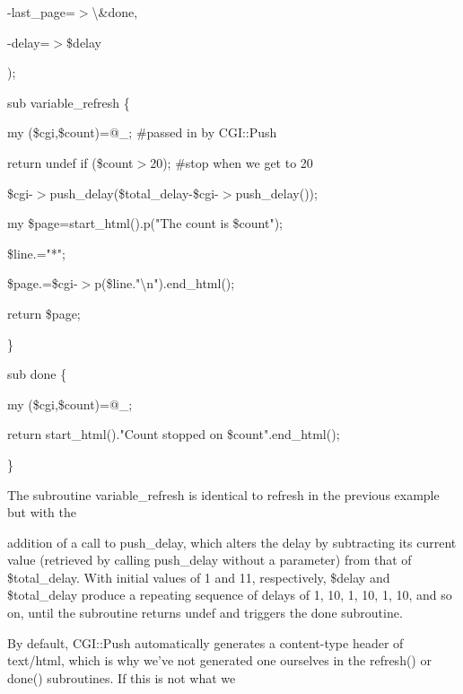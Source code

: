 \documentclass[a4paper,11pt]{book}
\begin{document}
\noindent -last\_page=$>$\textbackslash \&done,

\noindent -delay=$>$\$delay

\noindent );

\noindent 

\noindent 

\noindent sub variable\_refresh \{

\noindent my (\$cgi,\$count)=@\_; \#passed in by CGI::Push

\noindent 

\noindent return undef if (\$count$>$20); \#stop when we get to 20

\noindent 

\noindent \$cgi-$>$push\_delay(\$total\_delay-\$cgi-$>$push\_delay());

\noindent 

\noindent my \$page=start\_html().p("The count is \$count");

\noindent \$line.="*";

\noindent \$page.=\$cgi-$>$p(\$line."\textbackslash n").end\_html();

\noindent return \$page;

\noindent \}

\noindent 

\noindent sub done \{

\noindent my (\$cgi,\$count)=@\_;

\noindent 

\noindent return start\_html()."Count stopped on \$count".end\_html();

\noindent \}

\noindent 

\noindent The subroutine variable\_refresh is identical to refresh in the previous example but with the

\noindent addition of a call to push\_delay, which alters the delay by subtracting its current value (retrieved by calling push\_delay without a parameter) from that of \$total\_delay. With initial values of 1 and 11, respectively, \$delay and \$total\_delay produce a repeating sequence of delays of 1, 10, 1, 10, 1, 10, and so on, until the subroutine returns undef and triggers the done subroutine.

\noindent 

\noindent By default, CGI::Push automatically generates a content-type header of text/html, which is why we've not generated one ourselves in the refresh() or done() subroutines. If this is not what we
\end{document}
